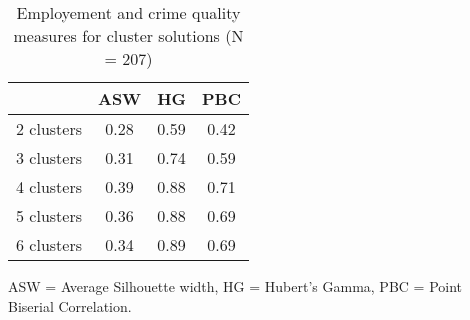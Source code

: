 \begin{table}[htp]
\footnotesize
\setlength{\tabcolsep}{35pt}
\renewcommand{\arraystretch}{1.3}
\begin{threeparttable}
\centering
\caption{Employement and crime quality measures for cluster solutions (N = 207)} 
\label{tab:quality_clusters_job_crime}
\begin{tabular}{lccc}
  \hline
 & ASW & HG & PBC \\ 
  \hline
2 clusters & 0.28 & 0.59 & 0.42 \\ 
  3 clusters & 0.31 & 0.74 & 0.59 \\ 
  4 clusters & 0.39 & 0.88 & 0.71 \\ 
  5 clusters & 0.36 & 0.88 & 0.69 \\ 
  6 clusters & 0.34 & 0.89 & 0.69 \\ 
   \hline
\end{tabular}
\begin{tablenotes}
\scriptsize
\item ASW = Average Silhouette width, HG = Hubert's Gamma, PBC = Point Biserial Correlation.
\end{tablenotes}
\end{threeparttable}
\end{table}
